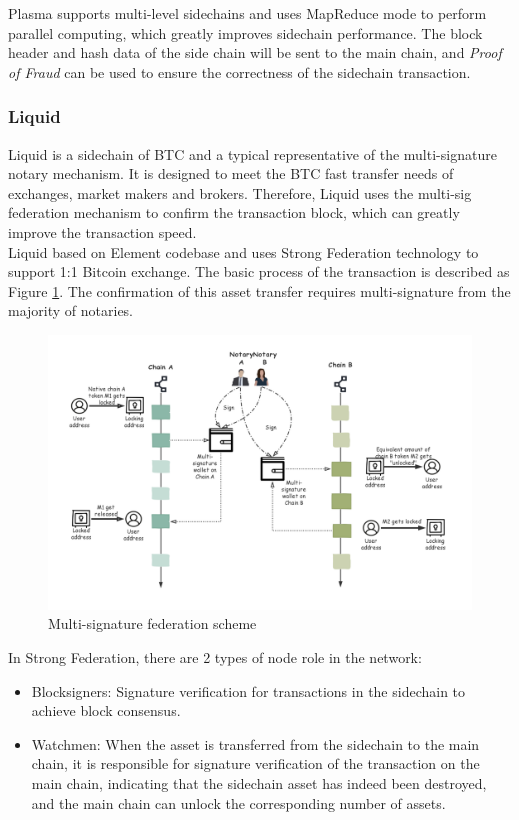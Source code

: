 \noindent Plasma supports multi-level sidechains and uses MapReduce mode to perform parallel computing, which greatly improves sidechain performance. The block header and hash data of the side chain will be sent to the main chain, and \textit{Proof of Fraud} can be used to ensure the correctness of the sidechain transaction.


\subsubsection{Liquid}
\noindent Liquid\cite{Liquid} is a sidechain of BTC and a typical representative of the multi-signature notary mechanism. It is designed to meet the BTC fast transfer needs of exchanges, market makers and brokers. Therefore, Liquid uses the multi-sig federation mechanism to confirm the transaction block, which can greatly improve the transaction speed.\\
\noindent Liquid based on Element codebase and uses Strong Federation technology to support 1:1 Bitcoin exchange. The basic process of the transaction is described as Figure \ref{fig:multisig}. The confirmation of this asset transfer requires multi-signature from the majority of notaries.

        \begin{figure}[H]
        \includegraphics[width=1\textwidth]{./figures/multi_sig.png}
        \centering
        \caption{Multi-signature federation scheme}%
        \centering
        \label{fig:multisig}
        \end{figure}
        
\noindent In Strong Federation, there are 2 types of node role in the network:
\begin{itemize}
    \item Blocksigners: Signature verification for transactions in the sidechain to achieve block consensus. 
    \item Watchmen: When the asset is transferred from the sidechain to the main chain, it is responsible for signature verification of the transaction on the main chain, indicating that the sidechain asset has indeed been destroyed, and the main chain can unlock the corresponding number of assets.
\end{itemize}

